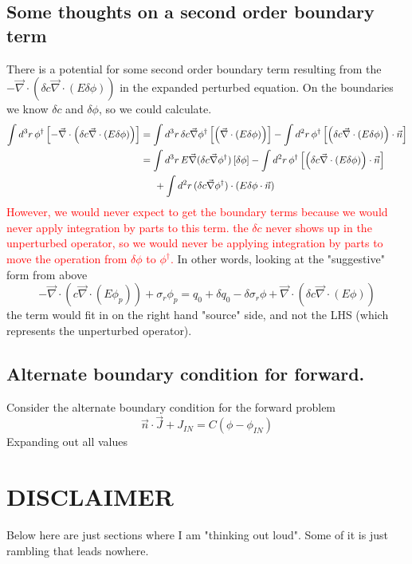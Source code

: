 \documentclass{article}
\newcommand{\vdiv}{\vec{\nabla} \cdot}
\newcommand{\vgrad}{\vec{\nabla}}
\newcommand{\intrrr}{\int d^3 r \,}
\newcommand{\intrr}{\int d^2 r \,}
\begin{document}
\subsection{Some thoughts on a second order boundary term}
There is a potential for some second order boundary term resulting from the $- \vdiv \left( \delta c \vdiv \left( E \delta \phi \right) \right)$ in the expanded perturbed equation. On the boundaries we know $\delta c$ and $\delta \phi$, so we could calculate.
\begin{align*}
\intrrr \phi^\dag \left[ - \vdiv \left( \delta c \vdiv \left( E \delta \phi \right) \right) \right] 
&= \intrrr \delta c  \vgrad \phi^\dag \left[  \left( \vdiv \left( E \delta \phi \right) \right) \right]  - \intrr \phi^\dag \left[  \left( \delta c \vdiv \left( E \delta \phi \right) \right) \cdot \vec{n} \right] \\
&= \intrrr E \vgrad (\delta c  \vgrad \phi^\dag) \left[ \delta \phi  \right]  - \intrr \phi^\dag \left[  \left( \delta c \vdiv \left( E \delta \phi \right) \right) \cdot \vec{n} \right] \\
&\hspace{5mm}+\intrr (\delta c  \vgrad \phi^\dag) \cdot (E \delta \phi \cdot \vec{n}) 
\end{align*}
\textcolor{red}{However, we would never expect to get the boundary terms because we would never apply integration by parts to this term. the $\delta c$ never shows up in the unperturbed operator, so we would never be applying integration by parts to move the operation from $\delta \phi$ to $\phi^\dag$.} In other words, looking at the "suggestive" form from above
\[ 
-\vdiv \left( c \vdiv \left( E \phi_p \right) \right) + \sigma_r \phi_p
= q_0 + \delta q_0 - \delta \sigma_r \phi + \vdiv \left( \delta c \vdiv \left( E \phi \right) \right) 
\]
the term would fit in on the right hand "source" side, and not the LHS (which represents the unperturbed operator).

\subsection*{Alternate boundary condition for forward.}
Consider the alternate boundary condition for the forward problem \cite{Wiesel}
\[
\vec{n} \cdot \vec{J} + J_{IN} = C (\phi - \phi_{IN})
\]
Expanding out all values

\section*{DISCLAIMER}
Below here are just sections where I am "thinking out loud". Some of it is just rambling that leads nowhere.
\end{document}
